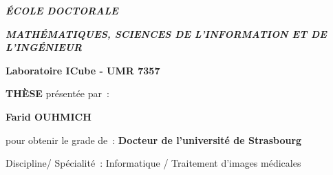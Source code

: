 \documentclass[]{memoir}
\begin{document}
\begin{titlingpage}
{
\centering


{\fontsize{14}{0}\selectfont \textbf{ \uppercase{\textit{\'{E}COLE DOCTORALE}}}}

\vspace{0.3cm}


{\fontsize{14}{0}\selectfont \textbf{ \uppercase{\textit{Math\'{e}matiques, Sciences de l'Information et de l'Ing\'{e}nieur}}}}

\vspace{0.5cm}

{\fontsize{16}{0}\selectfont \textbf{ Laboratoire ICube - UMR 7357}}

\vspace{1cm}

{\fontsize{22}{0}\selectfont \textbf{ \uppercase{\textsc{Th\`ese}}}} \hspace{0.2cm} {\fontsize{12}{0}\selectfont pr\'esent\'ee par~:}

\vspace{0.5cm}

{\fontsize{18}{0}\selectfont \textbf{ Farid OUHMICH}}


\vspace{2cm}


{\fontsize{13}{0}\selectfont pour obtenir le grade de~: \textbf{Docteur de l'universit\'e de
Strasbourg}}

\vspace{0.4cm}

{\fontsize{12}{0}\selectfont Discipline/ Sp\'ecialit\'e~: Informatique / Traitement d'images m\'edicales}


\vspace{2cm}

{\setlength{\fboxrule}{1pt}
\fbox{\parbox[c][3.5cm]{16cm}{
\centering\fontsize{23}{0}\selectfont \textbf{{\thetitle}}}}}

\vspace{3cm}
}

%


{
\fontsize{12}{2}\selectfont 
%		
	
}
\end{titlingpage}
\end{document}
